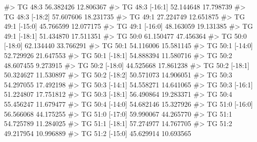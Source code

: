 \documentclass[
  letterpaper,
  DIV=11,
  numbers=noendperiod]{scrreprt}
\newenvironment{Shaded}{\begin{snugshade}}{\end{snugshade}}
\newcommand{\CommentTok}[1]{\textcolor[rgb]{0.37,0.37,0.37}{#1}}
\begin{document}
\begin{Shaded}
\begin{Highlighting}[]
\CommentTok{\#\textgreater{} TG 48:3                                   56.382426 12.806367}
\CommentTok{\#\textgreater{} TG 48:3 [{-}16:1]                           52.144648 17.798739}
\CommentTok{\#\textgreater{} TG 48:3 [{-}18:2]                           57.607606 18.231735}
\CommentTok{\#\textgreater{} TG 49:1                                   27.224749 12.651875}
\CommentTok{\#\textgreater{} TG 49:1 [{-}15:0]                           45.766599 12.077175}
\CommentTok{\#\textgreater{} TG 49:1 [{-}16:0]                           48.163059 19.131385}
\CommentTok{\#\textgreater{} TG 49:1 [{-}18:1]                           51.434870 17.511351}
\CommentTok{\#\textgreater{} TG 50:0                                   61.150477 47.456364}
\CommentTok{\#\textgreater{} TG 50:0 [{-}18:0]                           62.134440 33.766291}
\CommentTok{\#\textgreater{} TG 50:1                                   54.116006 15.581145}
\CommentTok{\#\textgreater{} TG 50:1 [{-}14:0]                           52.729926 21.647553}
\CommentTok{\#\textgreater{} TG 50:1 [{-}18:1]                           54.888394 11.580716}
\CommentTok{\#\textgreater{} TG 50:2                                   48.607455  9.273915}
\CommentTok{\#\textgreater{} TG 50:2 [{-}18:0]                           44.525668 17.861238}
\CommentTok{\#\textgreater{} TG 50:2 [{-}18:1]                           50.324627 11.530897}
\CommentTok{\#\textgreater{} TG 50:2 [{-}18:2]                           50.571073 14.906051}
\CommentTok{\#\textgreater{} TG 50:3                                   54.297055 17.492198}
\CommentTok{\#\textgreater{} TG 50:3 [{-}14:1]                           54.558271 14.641065}
\CommentTok{\#\textgreater{} TG 50:3 [{-}16:1]                           51.224807 17.751812}
\CommentTok{\#\textgreater{} TG 50:3 [{-}18:1]                           56.490864 19.283371}
\CommentTok{\#\textgreater{} TG 50:4                                   55.456247 11.679477}
\CommentTok{\#\textgreater{} TG 50:4 [{-}14:0]                           54.682146 15.327926}
\CommentTok{\#\textgreater{} TG 51:0 [{-}16:0]                           56.566068 44.175255}
\CommentTok{\#\textgreater{} TG 51:0 [{-}17:0]                           59.990067 44.265770}
\CommentTok{\#\textgreater{} TG 51:1                                   54.725789 11.284025}
\CommentTok{\#\textgreater{} TG 51:1 [{-}18:1]                           57.274977 14.767705}
\CommentTok{\#\textgreater{} TG 51:2                                   49.217954 10.996889}
\CommentTok{\#\textgreater{} TG 51:2 [{-}15:0]                           45.629914 10.693565}

\end{Highlighting}
\end{Shaded}
\end{document}
